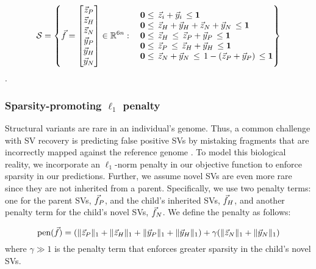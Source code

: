 \begin{align*}
	\mathcal{S} = \left\{
	\vec{f} = 
	\begin{bmatrix}
		\zP \\ \zH \\ \zN \\ \yP \\ \yH \\ \yN 
	\end{bmatrix} \in \R^{6n} : 
	\begin{matrix*}[l]
		&\mathbf{0} \leq \, \vec{z}_i + \vec{y}_i \, \leq \mathbf{1}\\
		& \mathbf{0} \leq \, \zH + \yH + \zN + \yN \, \leq \mathbf{1}\\
		&\mathbf{0} \leq \, \zH   \, \leq \, \zP + \yP  \, \leq \mathbf{1}\\
		&\mathbf{0} \leq \, \zP   \, \leq \, \zH + \yH  \, \leq \mathbf{1}\\
		&\mathbf{0} \leq \, \zN + \yN   \, \leq \, 1- (\zP +\yP)  \, \leq \mathbf{1}
	\end{matrix*}
	\right\}
\end{align*}. 

\subsubsection{Sparsity-promoting $\ell_1$ penalty}
Structural variants are rare in an individual's genome. Thus, a common challenge with SV recovery is predicting false positive SVs by mistaking fragments that are incorrectly mapped against the reference genome \cite{MB_diploidTrios}. To model this biological reality, we incorporate an $\ell_1$-norm penalty in our objective function to enforce sparsity in our predictions. Further, we assume novel SVs are even more rare since they are not inherited from a parent. Specifically, we use two penalty terms: one for the parent SVs, $\vec{f}_P$, and the child's inherited SVs, $\vec{f}_H$, and another penalty term for the child's novel SVs, $\vec{f}_N$. We define the penalty as follows:

\begin{equation*}
	\text{pen}(\vec{f}) = (\|\vec{z}_P\|_1 + \|\vec{z}_H\|_1 + \|\vec{y}_P\|_1 + \|\vec{y}_H\|_1) + \gamma (\|\vec{z}_N\|_1 + \|\vec{y}_N\|_1)
\end{equation*}
where $\gamma \gg 1$ is the penalty term that enforces greater sparsity in the child's novel SVs. \\

